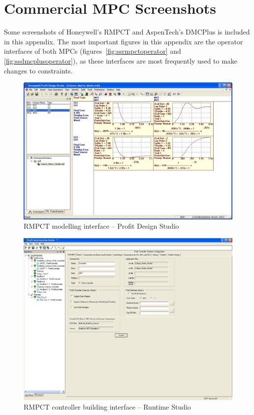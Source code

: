 \chapter{Commercial MPC Screenshots}\label{app:screenshots}
\begin{overview}
  Some screenshots of Honeywell's RMPCT and AspenTech's DMCPlus is included in this appendix.
  The most important figures in this appendix are the operator interfaces of both MPCs (figures~\ref{fig:ssrmpctoperator} and \ref{fig:ssdmcplusoperator}), as these interfaces are most frequently used to make changes to constraints.
\end{overview}

\newpage

\begin{landscape}

  \begin{figure}[htbp]
    \centering
      \includegraphics[width=25cm]{graph/ss_rmpctdesignstudio.jpg}
    \caption[RMPCT Profit Design Studio interface]{RMPCT modelling interface -- Profit Design Studio}
    \label{fig:ssrmpctmodel}
  \end{figure}

  \begin{figure}[htbp]
    \centering
      \includegraphics[width=20cm]{graph/ss_rmpctruntimestudio.jpg}
    \caption[RMPCT Runtime Studio interface]{RMPCT controller building interface -- Runtime Studio}
    \label{fig:ssrmpctcontrolbuild}
  \end{figure}


\end{landscape}

